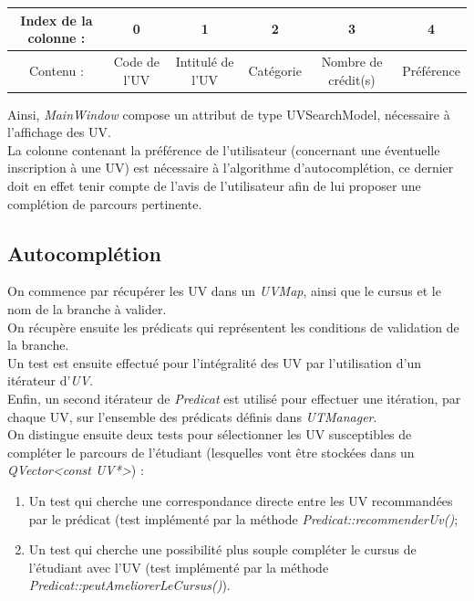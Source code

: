 \documentclass[a4paper,10pt,french]{report}
\begin{document}
	\begin{tabular}{|c||c|c|c|c|c|}
	\hline
	Index de la colonne :  & 0 & 1 & 2 & 3 & 4 \\ \hline
	Contenu : & Code de l'UV & Intitulé de l'UV & Catégorie & Nombre de crédit(s) & Préférence \\
	\hline
	\end{tabular}
    Ainsi, \emph{MainWindow} compose un attribut de type UVSearchModel, nécessaire à l'affichage des UV.\\ %
    
	
	La colonne contenant la préférence de l'utilisateur (concernant une éventuelle inscription à une UV) est nécessaire à l'algorithme d'autocomplétion, ce dernier doit en effet tenir compte de l'avis de l'utilisateur afin de lui proposer une complétion de parcours pertinente.
    
    
        
    \subsection{Autocomplétion}\label{subsec:Autocomplétion}
On commence par récupérer les UV dans un \emph{UVMap}, ainsi que le cursus et le nom de la branche à valider.\\
On récupère ensuite les prédicats qui représentent les conditions de validation de la branche.\\
Un test est ensuite effectué pour l'intégralité des UV par l'utilisation d'un itérateur d'\emph{UV}.\\
Enfin, un second itérateur de \emph{Predicat} est utilisé pour effectuer une itération, par chaque UV, sur l'ensemble des prédicats définis dans \emph{UTManager}.\\
On distingue ensuite deux tests pour sélectionner les UV susceptibles de compléter le parcours de l'étudiant (lesquelles vont être stockées dans un \emph{QVector<const UV*>}) :
\begin{enumerate}
\item Un test qui cherche une correspondance directe entre les UV recommandées par le prédicat (test implémenté par la méthode \emph{Predicat::recommenderUv()};
\item Un test qui cherche une possibilité plus souple compléter le cursus de l'étudiant avec l'UV (test implémenté par la méthode \emph{Predicat::peutAmeliorerLeCursus()}).
\end{enumerate}
\end{document}
